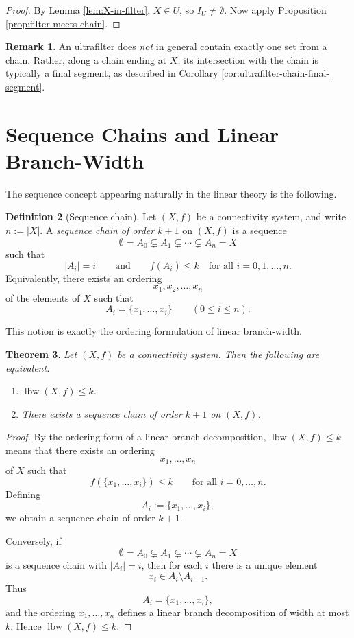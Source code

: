 \documentclass[10pt]{book}
\newtheorem{theorem}{Theorem}[section]
\theoremstyle{definition}
\newtheorem{remark}[theorem]{Remark}
\newtheorem{definition}[theorem]{Definition}
\begin{document}
\begin{proof}
By Lemma \ref{lem:X-in-filter}, \(X\in U\), so \(I_U\neq \emptyset\).
Now apply Proposition \ref{prop:filter-meets-chain}.
\end{proof}

\begin{remark}
An ultrafilter does \emph{not} in general contain exactly one set from a chain.
Rather, along a chain ending at \(X\), its intersection with the chain is typically a final segment, as described in Corollary \ref{cor:ultrafilter-chain-final-segment}.
\end{remark}

\section{Sequence Chains and Linear Branch-Width}

The sequence concept appearing naturally in the linear theory is the following.

\begin{definition}[Sequence chain]
\label{def:sequence_connectivity}
Let \((X,f)\) be a connectivity system, and write \(n:=|X|\).
A \emph{sequence chain of order \(k+1\)} on \((X,f)\) is a sequence
\[
\emptyset=A_0 \subsetneq A_1 \subsetneq \cdots \subsetneq A_n = X
\]
such that
\[
|A_i|=i
\qquad\text{and}\qquad
f(A_i)\leq k
\quad\text{for all } i=0,1,\dots,n.
\]
Equivalently, there exists an ordering
\[
x_1,x_2,\dots,x_n
\]
of the elements of \(X\) such that
\[
A_i=\{x_1,\dots,x_i\}
\qquad (0\leq i\leq n).
\]
\end{definition}

This notion is exactly the ordering formulation of linear branch-width.

\begin{theorem}
\label{thm:sequence-linear-bw}
Let \((X,f)\) be a connectivity system.
Then the following are equivalent:
\begin{enumerate}
    \item \(\operatorname{lbw}(X,f)\leq k\).
    \item There exists a sequence chain of order \(k+1\) on \((X,f)\).
\end{enumerate}
\end{theorem}

\begin{proof}
By the ordering form of a linear branch decomposition, \(\operatorname{lbw}(X,f)\leq k\) means that there exists an ordering
\[
x_1,\dots,x_n
\]
of \(X\) such that
\[
f(\{x_1,\dots,x_i\})\leq k
\qquad\text{for all } i=0,\dots,n.
\]
Defining
\[
A_i:=\{x_1,\dots,x_i\},
\]
we obtain a sequence chain of order \(k+1\).

Conversely, if
\[
\emptyset=A_0 \subsetneq A_1 \subsetneq \cdots \subsetneq A_n=X
\]
is a sequence chain with \(|A_i|=i\), then for each \(i\) there is a unique element
\[
x_i \in A_i\setminus A_{i-1}.
\]
Thus
\[
A_i=\{x_1,\dots,x_i\},
\]
and the ordering \(x_1,\dots,x_n\) defines a linear branch decomposition of width at most \(k\).
Hence \(\operatorname{lbw}(X,f)\leq k\).
\end{proof}
\end{document}
